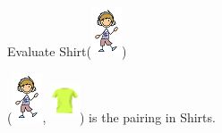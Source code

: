 \documentclass{ximera}
\begin{document}
\begin{exercise}
Evaluate Shirt({\includegraphics[width=34px,height=55px]{pics/elements/family/family4.png}})
  \begin{multipleChoice}
  \end{multipleChoice}
  \begin{feedback}
({\includegraphics[width=34px,height=55px]{pics/elements/family/family4.png}}, {\includegraphics[width=33px,height=49px]{pics/elements/shirts/shirts4.png}}) is the pairing in Shirts.
  \end{feedback}
\end{exercise}
\end{document}
